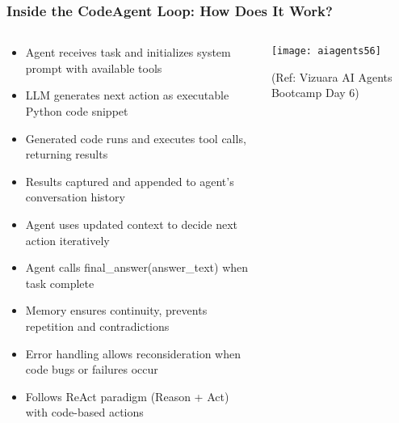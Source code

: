\begin{frame}[fragile]\frametitle{Inside the CodeAgent Loop: How Does It Work?}

\begin{columns}
    \begin{column}[T]{0.6\linewidth}
      \begin{itemize}
		\item Agent receives task and initializes system prompt with available tools
		\item LLM generates next action as executable Python code snippet
		\item Generated code runs and executes tool calls, returning results
		\item Results captured and appended to agent's conversation history
		\item Agent uses updated context to decide next action iteratively
		\item Agent calls final\_answer(answer\_text) when task complete
		\item Memory ensures continuity, prevents repetition and contradictions
		\item Error handling allows reconsideration when code bugs or failures occur
		\item Follows ReAct paradigm (Reason + Act) with code-based actions
	  \end{itemize}
    \end{column}
    \begin{column}[T]{0.4\linewidth}
		\begin{center}
		\texttt{[image: aiagents56]}
		
		{\tiny (Ref: Vizuara AI Agents Bootcamp Day 6)}

		\end{center}	
    \end{column}
  \end{columns}
  

\end{frame}

